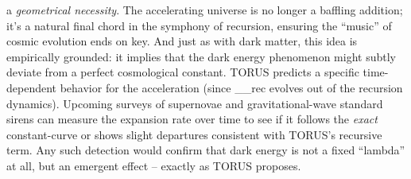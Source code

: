 \documentclass[
]{article}
\begin{document}
{a \emph{geometrical necessity}. The accelerating universe is no longer a
baffling addition; it's a natural final chord in the symphony of
recursion, ensuring the ``music'' of cosmic evolution ends on key. And
just as with dark matter, this idea is empirically grounded: it implies
that the dark energy phenomenon might subtly deviate from a perfect
cosmological constant. TORUS predicts a specific time-dependent behavior
for the acceleration (since
\Lambda\__{rec}{} evolves out
of the recursion dynamics)\hspace{0pt}. Upcoming surveys of supernovae
and gravitational-wave standard sirens can measure the expansion rate
over time to see if it follows the \emph{exact} constant-\Lambda curve or
shows slight departures consistent with TORUS's recursive
term\hspace{0pt}. Any such detection would confirm that dark energy is
not a fixed ``lambda'' at all, but an emergent effect -- exactly as
TORUS proposes.

}
\end{document}
